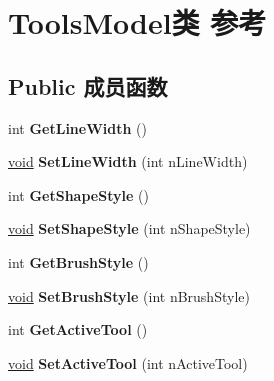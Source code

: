 \hypertarget{class_tools_model}{}\section{Tools\+Model类 参考}
\label{class_tools_model}
\subsection*{Public 成员函数}
\begin{DoxyCompactItemize}
\item 
\mbox{\label{class_tools_model_acfbe2258b7ec38cdadcd250837d1a4cc}} 
int {\bfseries Get\+Line\+Width} ()
\item 
\mbox{\label{class_tools_model_aee4690c533fc6e3ac6cb619cd1c85f24}} 
\hyperlink{interfacevoid}{void} {\bfseries Set\+Line\+Width} (int n\+Line\+Width)
\item 
\mbox{\label{class_tools_model_a1d5c380ee3cd494720561d25774fc06c}} 
int {\bfseries Get\+Shape\+Style} ()
\item 
\mbox{\label{class_tools_model_a88c4a8e14a261f50c1a841a84da8cb19}} 
\hyperlink{interfacevoid}{void} {\bfseries Set\+Shape\+Style} (int n\+Shape\+Style)
\item 
\mbox{\label{class_tools_model_a0e8c7ef774eb50a36d40fb2a1b9c487a}} 
int {\bfseries Get\+Brush\+Style} ()
\item 
\mbox{\label{class_tools_model_a914a420a902cb27bc8f8fe0924a5f513}} 
\hyperlink{interfacevoid}{void} {\bfseries Set\+Brush\+Style} (int n\+Brush\+Style)
\item 
\mbox{\label{class_tools_model_a51057308dc4709841ca9daebeedef7ac}} 
int {\bfseries Get\+Active\+Tool} ()
\item 
\mbox{\label{class_tools_model_a6559c66576ec84e511be82c40b82cdee}} 
\hyperlink{interfacevoid}{void} {\bfseries Set\+Active\+Tool} (int n\+Active\+Tool)
\item 
\mbox{\label{class_tools_model_a81b8bf0acda3aaed0c59e85235e1dc31}} 

\end{DoxyCompactItemize}
